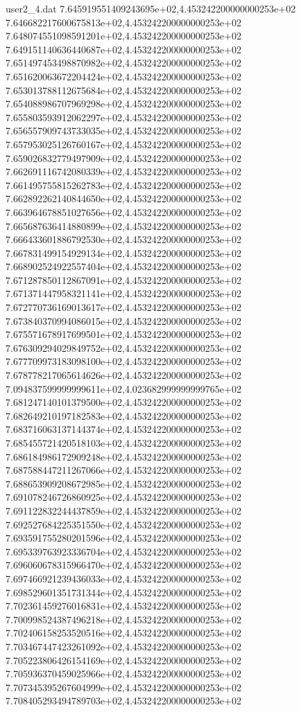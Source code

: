 \begin{filecontents}{user2_4.dat}
7.645919551409243695e+02,4.453242200000000253e+02
7.646682217600675813e+02,4.453242200000000253e+02
7.648074551098591201e+02,4.453242200000000253e+02
7.649151140636440687e+02,4.453242200000000253e+02
7.651497453498870982e+02,4.453242200000000253e+02
7.651620063672204424e+02,4.453242200000000253e+02
7.653013788112675684e+02,4.453242200000000253e+02
7.654088986707969298e+02,4.453242200000000253e+02
7.655803593912062297e+02,4.453242200000000253e+02
7.656557909743733035e+02,4.453242200000000253e+02
7.657953025126760167e+02,4.453242200000000253e+02
7.659026832779497909e+02,4.453242200000000253e+02
7.662691116742080339e+02,4.453242200000000253e+02
7.661495755815262783e+02,4.453242200000000253e+02
7.662892262140844650e+02,4.453242200000000253e+02
7.663964678851027656e+02,4.453242200000000253e+02
7.665687636414880899e+02,4.453242200000000253e+02
7.666433601886792530e+02,4.453242200000000253e+02
7.667831499154929134e+02,4.453242200000000253e+02
7.668902524922557404e+02,4.453242200000000253e+02
7.671287850112867091e+02,4.453242200000000253e+02
7.671371447958321141e+02,4.453242200000000253e+02
7.672770736169013617e+02,4.453242200000000253e+02
7.673840370994086015e+02,4.453242200000000253e+02
7.675571678917699501e+02,4.453242200000000253e+02
7.676309294029849752e+02,4.453242200000000253e+02
7.677709973183098100e+02,4.453242200000000253e+02
7.678778217065614626e+02,4.453242200000000253e+02
7.094837599999999611e+02,4.023682999999999765e+02
7.681247140101379500e+02,4.453242200000000253e+02
7.682649210197182583e+02,4.453242200000000253e+02
7.683716063137144374e+02,4.453242200000000253e+02
7.685455721420518103e+02,4.453242200000000253e+02
7.686184986172909248e+02,4.453242200000000253e+02
7.687588447211267066e+02,4.453242200000000253e+02
7.688653909208672985e+02,4.453242200000000253e+02
7.691078246726860925e+02,4.453242200000000253e+02
7.691122832244437859e+02,4.453242200000000253e+02
7.692527684225351550e+02,4.453242200000000253e+02
7.693591755280201596e+02,4.453242200000000253e+02
7.695339763923336704e+02,4.453242200000000253e+02
7.696060678315966470e+02,4.453242200000000253e+02
7.697466921239436033e+02,4.453242200000000253e+02
7.698529601351731344e+02,4.453242200000000253e+02
7.702361459276016831e+02,4.453242200000000253e+02
7.700998524387496218e+02,4.453242200000000253e+02
7.702406158253520516e+02,4.453242200000000253e+02
7.703467447423261092e+02,4.453242200000000253e+02
7.705223806426154169e+02,4.453242200000000253e+02
7.705936370459025966e+02,4.453242200000000253e+02
7.707345395267604999e+02,4.453242200000000253e+02
7.708405293494789703e+02,4.453242200000000253e+02

\end{filecontents}

